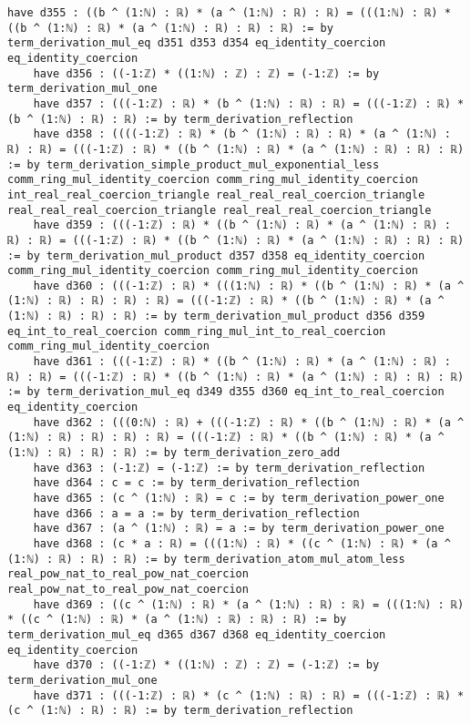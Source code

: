 \documentclass{article}
\begin{document}
\begin{tcolorbox}[colback=white!10, width=\linewidth]
\begin{lstlisting}[language=Lean4]
    have d355 : ((b ^ (1:ℕ) : ℝ) * (a ^ (1:ℕ) : ℝ) : ℝ) = (((1:ℕ) : ℝ) * ((b ^ (1:ℕ) : ℝ) * (a ^ (1:ℕ) : ℝ) : ℝ) : ℝ) := by term_derivation_mul_eq d351 d353 d354 eq_identity_coercion eq_identity_coercion
    have d356 : ((-1:ℤ) * ((1:ℕ) : ℤ) : ℤ) = (-1:ℤ) := by term_derivation_mul_one
    have d357 : (((-1:ℤ) : ℝ) * (b ^ (1:ℕ) : ℝ) : ℝ) = (((-1:ℤ) : ℝ) * (b ^ (1:ℕ) : ℝ) : ℝ) := by term_derivation_reflection
    have d358 : ((((-1:ℤ) : ℝ) * (b ^ (1:ℕ) : ℝ) : ℝ) * (a ^ (1:ℕ) : ℝ) : ℝ) = (((-1:ℤ) : ℝ) * ((b ^ (1:ℕ) : ℝ) * (a ^ (1:ℕ) : ℝ) : ℝ) : ℝ) := by term_derivation_simple_product_mul_exponential_less comm_ring_mul_identity_coercion comm_ring_mul_identity_coercion int_real_real_coercion_triangle real_real_real_coercion_triangle real_real_real_coercion_triangle real_real_real_coercion_triangle
    have d359 : (((-1:ℤ) : ℝ) * ((b ^ (1:ℕ) : ℝ) * (a ^ (1:ℕ) : ℝ) : ℝ) : ℝ) = (((-1:ℤ) : ℝ) * ((b ^ (1:ℕ) : ℝ) * (a ^ (1:ℕ) : ℝ) : ℝ) : ℝ) := by term_derivation_mul_product d357 d358 eq_identity_coercion comm_ring_mul_identity_coercion comm_ring_mul_identity_coercion
    have d360 : (((-1:ℤ) : ℝ) * (((1:ℕ) : ℝ) * ((b ^ (1:ℕ) : ℝ) * (a ^ (1:ℕ) : ℝ) : ℝ) : ℝ) : ℝ) = (((-1:ℤ) : ℝ) * ((b ^ (1:ℕ) : ℝ) * (a ^ (1:ℕ) : ℝ) : ℝ) : ℝ) := by term_derivation_mul_product d356 d359 eq_int_to_real_coercion comm_ring_mul_int_to_real_coercion comm_ring_mul_identity_coercion
    have d361 : (((-1:ℤ) : ℝ) * ((b ^ (1:ℕ) : ℝ) * (a ^ (1:ℕ) : ℝ) : ℝ) : ℝ) = (((-1:ℤ) : ℝ) * ((b ^ (1:ℕ) : ℝ) * (a ^ (1:ℕ) : ℝ) : ℝ) : ℝ) := by term_derivation_mul_eq d349 d355 d360 eq_int_to_real_coercion eq_identity_coercion
    have d362 : (((0:ℕ) : ℝ) + (((-1:ℤ) : ℝ) * ((b ^ (1:ℕ) : ℝ) * (a ^ (1:ℕ) : ℝ) : ℝ) : ℝ) : ℝ) = (((-1:ℤ) : ℝ) * ((b ^ (1:ℕ) : ℝ) * (a ^ (1:ℕ) : ℝ) : ℝ) : ℝ) := by term_derivation_zero_add
    have d363 : (-1:ℤ) = (-1:ℤ) := by term_derivation_reflection
    have d364 : c = c := by term_derivation_reflection
    have d365 : (c ^ (1:ℕ) : ℝ) = c := by term_derivation_power_one
    have d366 : a = a := by term_derivation_reflection
    have d367 : (a ^ (1:ℕ) : ℝ) = a := by term_derivation_power_one
    have d368 : (c * a : ℝ) = (((1:ℕ) : ℝ) * ((c ^ (1:ℕ) : ℝ) * (a ^ (1:ℕ) : ℝ) : ℝ) : ℝ) := by term_derivation_atom_mul_atom_less real_pow_nat_to_real_pow_nat_coercion real_pow_nat_to_real_pow_nat_coercion
    have d369 : ((c ^ (1:ℕ) : ℝ) * (a ^ (1:ℕ) : ℝ) : ℝ) = (((1:ℕ) : ℝ) * ((c ^ (1:ℕ) : ℝ) * (a ^ (1:ℕ) : ℝ) : ℝ) : ℝ) := by term_derivation_mul_eq d365 d367 d368 eq_identity_coercion eq_identity_coercion
    have d370 : ((-1:ℤ) * ((1:ℕ) : ℤ) : ℤ) = (-1:ℤ) := by term_derivation_mul_one
    have d371 : (((-1:ℤ) : ℝ) * (c ^ (1:ℕ) : ℝ) : ℝ) = (((-1:ℤ) : ℝ) * (c ^ (1:ℕ) : ℝ) : ℝ) := by term_derivation_reflection

\end{lstlisting}
\end{tcolorbox}
\end{document}
